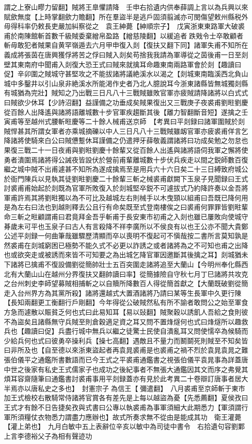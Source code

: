 謂之上寮山疁力留翻】賊將王臯懼請降　壬申右拾遺内供奉薛調上言以為兵興以來賦歛無度【上時掌翻歛力贍翻】所在羣盜半是逃戶固須翦滅亦可閔傷望敕州縣税外毋得科率仍敕長吏嚴加糾察從之　袁王紳薨【紳順宗子】　戊寅浙東東路軍大破裘甫於南陳館斬首數千級賊委棄繒帛盈路【繒慈陵翻】以緩追者跌戣令士卒敢顧者斬毋敢犯者賊果自黄罕嶺遁去六月甲申復入剡【復扶又翻下同】諸軍失甫不知所在義成將張茵在唐興獲俘將苦之俘曰賊入剡矣苟捨我我請為軍導從之茵後甫一日至剡壁其東南府中聞甫入剡復大恐王式曰賊來就擒耳命趣東南兩路軍會於剡【趣讀曰促】辛卯圍之賊城守甚堅攻之不能拔諸將議絶溪水以渴之【剡城東南臨溪西北負山城中多鑿井以引山泉非絶溪水所能渇作史者乃北人臆說耳今浙東諸縣皆無城獨剡縣有城猶為完壯】賊知之乃出戰三日凡八十三戰賊雖敗官軍亦疲賊請降諸將以白式式曰賊欲少休耳【少詩沼翻】益謹備之功垂成矣賊果復出又三戰庚子夜裘甫劉暀劉慶從百餘人出降遙與諸將語離城數十步官軍疾趨斷其後【離力智翻斷音短】遂擒之壬寅甫等至越州式腰斬暀慶等二十餘人械甫送京師　【考異曰平剡録曰諸軍圍賊於剡賊悍甚其所謂女軍者亦乘城摘礫以中人三日凡八十三戰賊雖衂官軍亦疲裘甫佯言乞降諸將使騎來白公曰賊憊蹔休耳謹備之仍遣押牙薛敬義謂諸將曰功成矣勉之勿怠也果復三戰二十一日夜甫與劉暀劉慶十餘輩又從百餘人出遙與諸將語伺我軍之懈將使勇者潰圍焉諸將得公誡夜皆設伏於營前甫輩離城數十步伏兵疾走以間之鋭師數百復繼之城中賊不出甫遽甚不知所為遂成擒焉至是用兵六十六日矣二十三日縛致府城公於衙門陳兵以見執其徒劉暀劉慶二十餘輩三斬之械裘甫獻闕下玉泉子見聞録曰王式討裘甫甫始起於剡既為官軍所敗復入於剡城堅卒鋭不可遽拔式乃約降許奏以金吾將軍甫許焉其將劉暀獨以為不可比及越城左右則械手以木曳頸以組甫曰吾既已降何用是為左右曰法也到越則釋去公且行有命矣既至式登南樓俟之曰裘甫何罪罪皆劉暀輩命三斬之暀顧謂甫曰君竟拜金吾乎斬甫于長安東市初甫之入剡也雖已屢敗向使城守朞歲未可平也玉泉子曰古人有言殺降不祥李廣所以不侯良有以也王公亦不聞大貴鄭公述平剡録一何曲筆哉雖驟歷清顯而卒以喪明不復起可不愼哉按二書所言莫知孰是然裘甫在剡城窮困已極勢不能久式不必更以詐誘之或者諸將為之不可知也甫之出降也或欲突走或被誘而來皆不可知要之為出城乞降官軍因邀斷其後擒之耳】剡城猶未下諸將已擒甫不復設備劉從簡帥壯士五百突圍走諸將追至大蘭山【今明州奉化縣西北有大蘭山山在越州分界復扶又翻帥讀曰率】從簡據險自守秋七月丁巳諸將共攻克之台州刺史李師望募賊相捕斬之以自贖所降數百人得從簡首獻之【大蘭既破劉從簡走入台州界方為其黨所殺】諸將還越式大置酒諸將乃請曰某等生長軍中久更行陳【長知兩翻更工衡翻行戶剛翻】今年得從公破賊然私有所不諭者敢問公之始至軍食方急而遽散以賑貧乏何也式曰此易知耳【易以䜴翻】賊聚穀以誘飢人吾給之食則彼不為盜矣且諸縣無守兵賊至則倉穀適足資之耳又問不置烽燧何也式曰烽燧所以趣救兵也【趣讀曰促】兵盡行城中無兵以繼之徒驚士民使自潰亂耳又問使懦卒為候騎而少給兵何也式曰彼勇卒操利兵【操七高翻】遇敵且不量力而鬭鬬死則賊至不知矣皆曰非所及也【自至德以來浙東盜起者再袁晁裘甫是也裘甫之禍不烈於袁晁袁晁之難張伯儀平之通鑑所書數語而已今王式之平裘甫通鑑書之視張伯儀平袁晁事為詳蓋唐中世之後家有私史王式儒家子也成功之後紀事者不無張大通鑑因其文而序之弗覺其煩耳容齋隨筆曰通鑑書討裘甫事用平剡録蓋亦有見於此考異二十卷辯訂唐事者居大半焉亦以唐私史之多也】　封憲宗子為信王【彌遣翻】　八月裘甫至京師斬于東市加王式檢校右散騎常侍諸將官賞各有差先是上每以越盜為憂【先悉薦翻】夏侯孜曰王式才有餘不日告捷矣孜與式書曰公專以執裘甫為事軍須細大此期悉力【軍須謂行軍所須糧仗衣物悉力謂盡力應辦也】故式所奏求無不從由是能成其功　衛王灌薨【灌上弟也】　九月白敏中五上表辭位辛亥以敏中為司徒中書令　右拾遺句容劉鄴上言李德裕父子為相有聲迹功